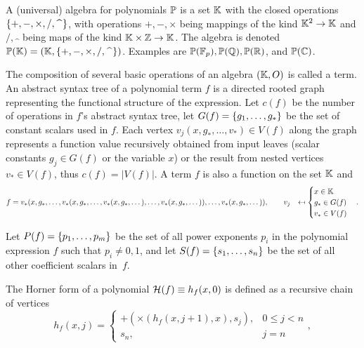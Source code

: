 \documentclass[]{elsarticle}
\begin{document}
A (universal) algebra \cite{sapir} for polynomials $\mathbb{P}$ is a set $\mathbb{K}$ with the closed operations $\left\{ +,-,\times,/,\widehat{\ \ } \right\}$, with operations $+,-,\times$ being mappings of the kind $\mathbb{K}^2\rightarrow\mathbb{K}$ and $/,\widehat{\ \ }$ being maps of the kind $\mathbb{K}\times\mathbb{Z}\rightarrow\mathbb{K}$. The algebra is denoted $\mathbb{P}(\mathbb{K})=(\mathbb{K},\left\{ +,-,\times,/,\widehat{\ \ } \right\})$. Examples are $\mathbb{P}(\mathbb{F}_p),\mathbb{P}(\mathbb{Q}),\mathbb{P}(\mathbb{R})$, and $\mathbb{P}(\mathbb{C})$.
\begin{definition}
	[Term] The composition of several basic operations of an algebra $(\mathbb{K},O)$ is called a term.
	An abstract syntax tree of a polynomial term $f$ is a directed rooted graph representing the functional structure of the expression.
	Let $c(f)$ be the number of operations in $f$'s abstract syntax tree, %
	let $G(f)=\left\{ g_1,\dots,g_* \right\}$ be the set of constant scalars used in $f$.
	Each vertex $v_j(x,g_*,\dots,v_*)\in V(f)$ along the graph represents a function value recursively obtained from input leaves (scalar constants $g_j\in G(f)$ or the variable $x$) or the result from nested vertices $v_*\in V(f)$, thus $c(f) = |V(f)|$. A term $f$ is also a function on the set $\mathbb{K}$ and
	\begin{align*}
		f &= v_*(x,g_*,\dots,v_*(x,g_*,\dots,v_*(x,g_*,\dots),\dots,v_*(x,g_*,\dots)),\dots,v_*(x,g_*,\dots)), \qquad v_j &\mapsfrom \begin{cases} x\in\mathbb{K} \\ g_*\in G(f)\\ v_*\in V(f) \end{cases}.
	\end{align*}
\end{definition}
\begin{definition}
	Let $P(f)=\left\{ p_1,\dots,p_m \right\}$ be the set of all power exponents $p_i$ in the polynomial expression $f$ such that $p_i\neq 0,1$, and let $S(f)=\left\{ s_1,\dots,s_n \right\}$ be the set of all other coefficient scalars in~$f$.
\end{definition}
The Horner form of a polynomial $\mathcal{H}(f)\equiv h_f(x,0)$ is defined as a recursive chain of vertices $$ h_f(x,j) = \begin{cases} +(\times( h_f(x,j+1),x),s_j), & 0 \leq j < n \\ s_n, & j = n \end{cases},$$
\end{document}
